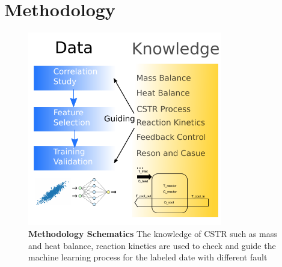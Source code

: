\documentclass[fleqn,11pt]{wlscirep}
\begin{document}
\section{Methodology}
\begin{figure}[h]
    \centering
    \includegraphics[width=8.5cm]{method.pdf}
    \caption{
    \textbf{Methodology Schematics } The knowledge of CSTR such as mass and heat balance, reaction kinetics are used to check and guide the machine learning process for the labeled date with different fault}
    \label{fig:1}
\end{figure}
\end{document}
